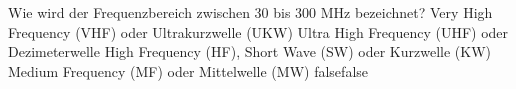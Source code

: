     {Wie wird der Frequenzbereich zwischen 30 bis 300 MHz bezeichnet?}
    {Very High Frequency (VHF) oder Ultrakurzwelle (UKW)}
    {Ultra High Frequency (UHF) oder Dezimeterwelle}
    {High Frequency (HF), Short Wave (SW) oder Kurzwelle (KW)}
    {Medium Frequency (MF) oder Mittelwelle (MW)}
    {false}{false}